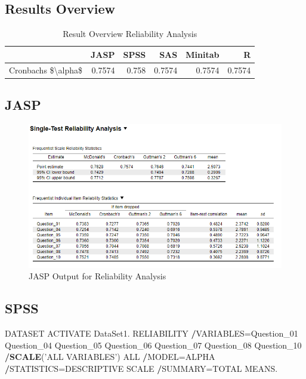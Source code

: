 \documentclass[
]{book}
\newenvironment{Shaded}{\begin{snugshade}}{\end{snugshade}}
\newcommand{\DecValTok}[1]{\textcolor[rgb]{0.00,0.00,0.81}{#1}}
\newcommand{\KeywordTok}[1]{\textcolor[rgb]{0.13,0.29,0.53}{\textbf{#1}}}
\newcommand{\NormalTok}[1]{#1}
\newcommand{\OperatorTok}[1]{\textcolor[rgb]{0.81,0.36,0.00}{\textbf{#1}}}
\newcommand{\StringTok}[1]{\textcolor[rgb]{0.31,0.60,0.02}{#1}}
\begin{document}
\hypertarget{results-overview}{%
\subsection{Results Overview}\label{results-overview}}

\begin{table}

\caption{\label{tab:unnamed-chunk-126}Result Overview Reliability Analysis}
\centering
\begin{tabular}[t]{lrrrrr}
\toprule
  & JASP & SPSS & SAS & Minitab & R\\
\midrule
Cronbachs \$\textbackslash{}alpha\$ & 0.7574 & 0.758 & 0.7574 & 0.7574 & 0.7574\\
\bottomrule
\end{tabular}
\end{table}

\hypertarget{jasp}{%
\subsection{JASP}\label{jasp}}

\begin{figure}[!h]
\includegraphics{Screenshots/Reliability/ReliabilityJASP} \caption{\label{fig:reliJASP}JASP Output for Reliability Analysis}\label{fig:reliJASP}
\end{figure}

\hypertarget{spss}{%
\subsection{SPSS}\label{spss}}

\begin{Shaded}
\begin{Highlighting}[]
\NormalTok{DATASET ACTIVATE DataSet1.}
\NormalTok{RELIABILITY}
  \OperatorTok{/}\NormalTok{VARIABLES=Question_}\DecValTok{01}\NormalTok{ Question_}\DecValTok{04}\NormalTok{ Question_}\DecValTok{05}\NormalTok{ Question_}\DecValTok{06}\NormalTok{ Question_}\DecValTok{07}\NormalTok{ Question_}\DecValTok{08}\NormalTok{ Question_}\DecValTok{10}
  \OperatorTok{/}\KeywordTok{SCALE}\NormalTok{(}\StringTok{'ALL VARIABLES'}\NormalTok{) ALL}
  \OperatorTok{/}\NormalTok{MODEL=ALPHA}
  \OperatorTok{/}\NormalTok{STATISTICS=DESCRIPTIVE SCALE}
  \OperatorTok{/}\NormalTok{SUMMARY=TOTAL MEANS.}
\end{Highlighting}
\end{Shaded}
\end{document}
